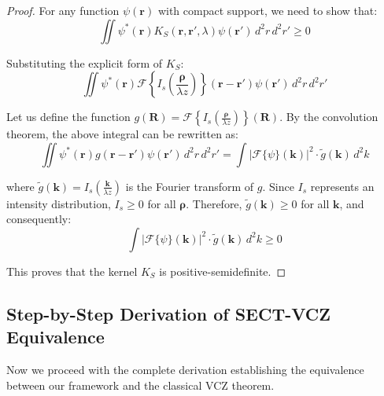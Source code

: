 \documentclass[a4paper,12pt]{article}
\begin{document}
\begin{proof}
For any function $\psi(\mathbf{r})$ with compact support, we need to show that:
\begin{equation}
\iint \psi^*(\mathbf{r}) K_S(\mathbf{r}, \mathbf{r}', \lambda) \psi(\mathbf{r}') \, d^2r \, d^2r' \geq 0
\end{equation}

Substituting the explicit form of $K_S$:
\begin{equation}
\iint \psi^*(\mathbf{r}) \mathcal{F}\left\{I_s\left(\frac{\mathbf{\rho}}{\lambda z}\right)\right\}(\mathbf{r} - \mathbf{r}') \psi(\mathbf{r}') \, d^2r \, d^2r'
\end{equation}

Let us define the function $g(\mathbf{R}) = \mathcal{F}\left\{I_s\left(\frac{\mathbf{\rho}}{\lambda z}\right)\right\}(\mathbf{R})$. By the convolution theorem, the above integral can be rewritten as:
\begin{equation}
\iint \psi^*(\mathbf{r}) g(\mathbf{r} - \mathbf{r}') \psi(\mathbf{r}') \, d^2r \, d^2r' = \int \left|\mathcal{F}\{\psi\}(\mathbf{k})\right|^2 \cdot \tilde{g}(\mathbf{k}) \, d^2k
\end{equation}

where $\tilde{g}(\mathbf{k}) = I_s\left(\frac{\mathbf{k}}{\lambda z}\right)$ is the Fourier transform of $g$. Since $I_s$ represents an intensity distribution, $I_s \geq 0$ for all $\mathbf{\rho}$. Therefore, $\tilde{g}(\mathbf{k}) \geq 0$ for all $\mathbf{k}$, and consequently:
\begin{equation}
\int \left|\mathcal{F}\{\psi\}(\mathbf{k})\right|^2 \cdot \tilde{g}(\mathbf{k}) \, d^2k \geq 0
\end{equation}

This proves that the kernel $K_S$ is positive-semidefinite.
\end{proof}

\subsection{Step-by-Step Derivation of SECT-VCZ Equivalence}

Now we proceed with the complete derivation establishing the equivalence between our framework and the classical VCZ theorem.
\end{document}
